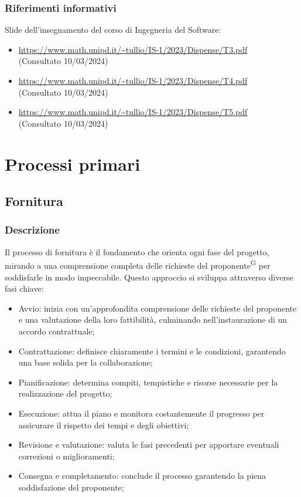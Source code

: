 \documentclass[5pt]{article}
\begin{document}
\subsubsection{Riferimenti informativi}
Slide dell’insegnamento del corso di Ingegneria del Software:
\begin{itemize}
\item \url{https://www.math.unipd.it/~tullio/IS-1/2023/Dispense/T3.pdf} \\ (Consultato 10/03/2024)
\item \url{https://www.math.unipd.it/~tullio/IS-1/2023/Dispense/T4.pdf} \\ (Consultato 10/03/2024)
\item \url{https://www.math.unipd.it/~tullio/IS-1/2023/Dispense/T5.pdf} \\ (Consultato 10/03/2024)
\end{itemize}

\section{Processi primari}

\subsection{Fornitura}

\subsubsection{Descrizione}

Il processo di fornitura è il fondamento che orienta ogni fase del progetto, mirando a una comprensione completa delle richieste del proponente\textsuperscript{G} per soddisfarle in modo impeccabile. Questo approccio si sviluppa attraverso diverse fasi chiave:
\begin{itemize}
    \item{Avvio:} inizia con un'approfondita comprensione delle richieste del proponente e una valutazione della loro fattibilità, culminando nell'instaurazione di un accordo contrattuale;
    \item{Contrattazione:} definisce chiaramente i termini e le condizioni, garantendo una base solida per la collaborazione;
    \item{Pianificazione:} determina compiti, tempistiche e risorse necessarie per la realizzazione del progetto;
    \item{Esecuzione:} attua il piano e monitora costantemente il progresso per assicurare il rispetto dei tempi e degli obiettivi;
    \item{Revisione e valutazione:} valuta le fasi precedenti per apportare eventuali correzioni o miglioramenti;
    \item{Consegna e completamento:} conclude il processo garantendo la piena soddisfazione del proponente;
\end{itemize}
\end{document}

